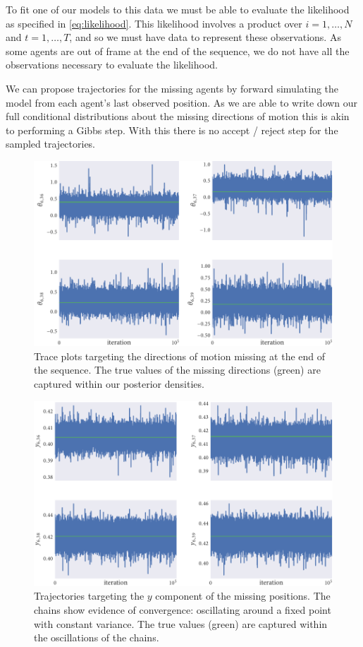 To fit one of our models to this data we must be able to evaluate the
likelihood as specified in \cref{eq:likelihood}. This likelihood involves a
product over $i=1,\ldots,N$ and $t=1,\ldots,T$, and so we must have data to
represent these observations. As some agents are out of frame at the end of the
sequence, we do not have all the observations necessary to evaluate the
likelihood.

We can propose trajectories for the missing agents by forward simulating the
model from each agent's last observed position. As we are able to write down
our full conditional distributions about the missing directions of motion this
is akin to performing a Gibbs step. With this there is no accept / reject step
for the sampled trajectories.

\begin{figure}[tbp]
  \includegraphics{end/dir_trace.pdf}
  \caption{Trace plots targeting the directions of motion missing at the end of
  the sequence. The true values of the missing directions (green) are captured
  within our posterior densities.}
  \label{fig:end_dir_trace}
\end{figure}
\begin{figure}[tbp]
  \includegraphics{end/y_trace.pdf}
  \caption{Trajectories targeting the $y$ component of the missing positions.
  The chains show evidence of convergence: oscillating around a fixed point with
  constant variance. The true values (green) are captured within the
  oscillations of the chains.}
  \label{fig:end_y_trace}
\end{figure}

